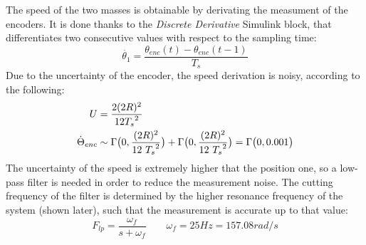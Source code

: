The speed of the two masses is obtainable by derivating the measument of the encoders. It is done thanks to the \textit{Discrete Derivative} Simulink block, that differentiates two consecutive values with respect to the sampling time:
\[
	\dot{\theta_1} = \frac{ \theta_{enc}(t) - \theta_{enc}(t-1)}{T_s}
\]
Due to the uncertainty of the encoder, the speed derivation is noisy, according to the following:
\begin{align*}
	U &= \frac{2(2R)^2}{12 {T_s}^2 } \\
	\dot{\Theta}_{enc}	&\sim \Gamma \bigl{(} 0,\frac{(2R)^2}{12 \ {T_s}^2} \bigr{)} + \Gamma \bigl{(} 0,\frac{(2R)^2}{12 \ {T_s}^2} \bigr{)} = \Gamma \bigl{(} 0, 0.001 \bigr{)}
\end{align*}
The uncertainty of the speed is extremely higher that the position one, so a low-pass filter is needed in order to reduce the measurement noise. The cutting frequency of the filter is determined by the higher resonance frequency of the system (shown later), such that the measurement is accurate up to that value:
\[
	F_{lp} = \frac{ \omega_f }{ s+\omega_f} \qquad \omega_f=25Hz=157.08 rad/s
\]